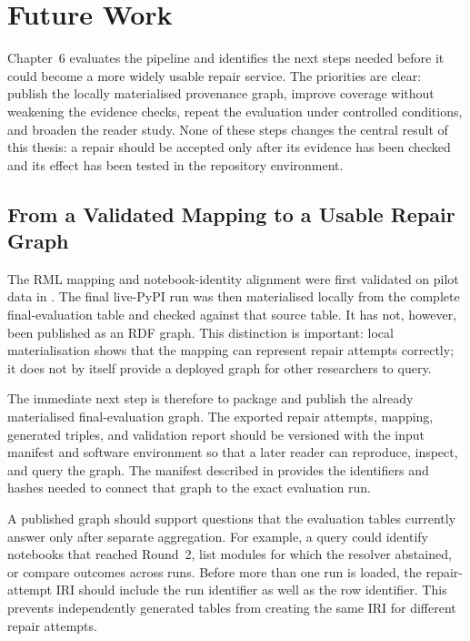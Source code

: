 \chapter{Future Work}
\label{chap:future-work}

Chapter~6 evaluates the pipeline and identifies the next steps needed before it
could become a more widely usable repair service. The priorities are clear:
publish the locally materialised provenance graph, improve coverage without weakening the
evidence checks, repeat the evaluation under controlled conditions, and broaden
the reader study. None of these steps changes the central result of this thesis:
a repair should be accepted only after its evidence has been checked and its
effect has been tested in the repository environment.

\section{From a Validated Mapping to a Usable Repair Graph}
\label{sec:fw-kg}

The RML mapping and notebook-identity alignment were first validated on pilot
data in . The final live-PyPI run was then
materialised locally from the complete final-evaluation table and checked against
that source table. It has not, however, been published as an RDF graph. This
distinction is important: local materialisation shows that the mapping can
represent repair attempts correctly; it does not by itself provide a deployed
graph for other researchers to query.

The immediate next step is therefore to package and publish the already
materialised final-evaluation graph. The exported repair attempts, mapping,
generated triples, and validation report should be versioned with the input
manifest and software environment so that a later reader can reproduce,
inspect, and query the graph. The manifest described in
 provides the identifiers and hashes needed to
connect that graph to the exact evaluation run.

A published graph should support questions that the evaluation tables currently
answer only after separate aggregation. For example, a query could identify
notebooks that reached Round~2, list modules for which the resolver abstained,
or compare outcomes across runs. Before more than one run is loaded, the
repair-attempt IRI should include the run identifier as well as the row
identifier. This prevents independently generated tables from creating the same
IRI for different repair attempts.

